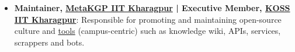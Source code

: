 \documentclass[a4paper,10pt]{extarticle} %
\begin{document}
\begin{itemize}[leftmargin=0.55cm, rightmargin=0.2cm, label={\Large\textbullet}]


\item \textbf{Maintainer, \href{https://wiki.metakgp.org/w/Metakgp:About}{MetaKGP IIT Kharagpur} | Executive Member, \href{https://kossiitkgp.org/about/index.html}{KOSS IIT Kharagpur}}: Responsible for promoting and maintaining open-source culture and \href{https://github.com/metakgp/}{tools} (campus-centric) such as knowledge wiki, APIs, services, scrappers and bots.
\end{itemize}






\end{document}
